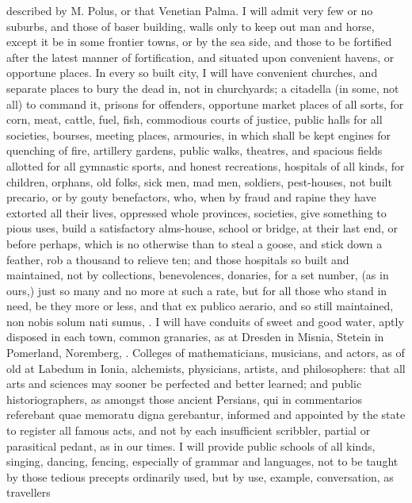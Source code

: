 {described by M. Polus, or that Venetian Palma. I will admit very few or
no suburbs, and those of baser building, walls only to keep out man and
horse, except it be in some frontier towns, or by the sea side, and
those to be fortified  after the latest manner of fortification,
and situated upon convenient havens, or opportune places. In every so
built city, I will have convenient churches, and separate places to
bury the dead in, not in churchyards; a citadella (in some, not all) to
command it, prisons for offenders, opportune market places of all
sorts, for corn, meat, cattle, fuel, fish, commodious courts of
justice, public halls for all societies, bourses, meeting places,
armouries, in which shall be kept engines for quenching of fire,
artillery gardens, public walks, theatres, and spacious fields allotted
for all gymnastic sports, and honest recreations, hospitals of all
kinds, for children, orphans, old folks, sick men, mad men, soldiers,
pest-houses, \etc{} not built precario, or by gouty benefactors, who, when
by fraud and rapine they have extorted all their lives, oppressed whole
provinces, societies, \etc{} give something to pious uses, build a
satisfactory alms-house, school or bridge, \etc{} at their last end, or
before perhaps, which is no otherwise than to steal a goose, and stick
down a feather, rob a thousand to relieve ten; and those hospitals so
built and maintained, not by collections, benevolences, donaries, for a
set number, (as in ours,) just so many and no more at such a rate, but
for all those who stand in need, be they more or less, and that ex
publico aerario, and so still maintained, non nobis solum nati sumus,
\etc{}. I will have conduits of sweet and good water, aptly disposed in
each town, common  granaries, as at Dresden in Misnia, Stetein in
Pomerland, Noremberg, \etc{}. Colleges of mathematicians, musicians, and
actors, as of old at Labedum in Ionia, alchemists, physicians,
artists, and philosophers: that all arts and sciences may sooner be
perfected and better learned; and public historiographers, as amongst
those ancient Persians, qui in commentarios referebant quae
memoratu digna gerebantur, informed and appointed by the state to
register all famous acts, and not by each insufficient scribbler,
partial or parasitical pedant, as in our times. I will provide public
schools of all kinds, singing, dancing, fencing, \etc{} especially of
grammar and languages, not to be taught by those tedious precepts
ordinarily used, but by use, example, conversation, as travellers
}
